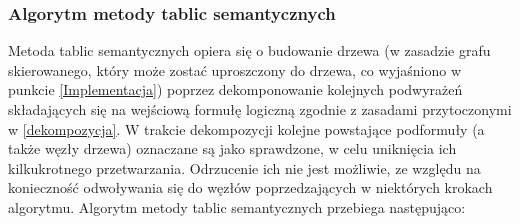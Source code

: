 \documentclass[12pt,a4paper,titlepage]{article}
\begin{document}
\subsubsection{Algorytm metody tablic semantycznych}
\label{tableau}
Metoda tablic semantycznych opiera się o budowanie drzewa (w zasadzie grafu skierowanego, który może zostać uproszczony do drzewa, co wyjaśniono w punkcie \ref{Implementacja}) poprzez dekomponowanie kolejnych podwyrażeń składających się na wejściową formułę logiczną zgodnie z zasadami przytoczonymi w \ref{dekompozycja}. W trakcie dekompozycji kolejne powstające podformuły (a także węzły drzewa) oznaczane są jako sprawdzone, w celu uniknięcia ich kilkukrotnego przetwarzania. Odrzucenie ich nie jest możliwie, ze względu na konieczność odwoływania się do węzłów poprzedzających w niektórych krokach algorytmu.
\linebreak
Algorytm metody tablic semantycznych przebiega następująco:
\end{document}
